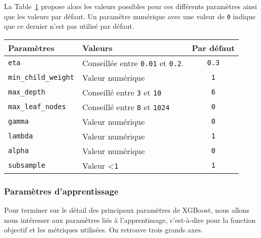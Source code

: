 La Table~\ref{tab:params-boosting} propose alors les valeurs possibles pour ces différents paramètres ainsi que les valeurs par défaut. Un paramètre numérique avec une valeur de \texttt{0} indique que ce dernier n'est pas utilisé par défaut.
\begin{table}[h]
  \begin{margincap}
    \centering
    \begin{tabular}{p{}p{}c}
	\toprule
	\textbf{Paramètres} & \textbf{Valeurs} & \textbf{Par défaut} \\
	\midrule
	\texttt{eta} & Conseillée entre \texttt{0.01} et \texttt{0.2}. & \texttt{0.3} \\
	\texttt{min\_child\_weight} & Valeur numérique & \texttt{1}\\
	\texttt{max\_depth} & Conseillé entre \texttt{3} et \texttt{10} & \texttt{6} \\
	\texttt{max\_leaf\_nodes} & Conseillé entre \texttt{8} et \texttt{1024} & \texttt{0} \\
	\texttt{gamma} & Valeur numérique & \texttt{0} \\
	\texttt{lambda} & Valeur numérique & \texttt{1} \\
	\texttt{alpha} & Valeur numérique & \texttt{0} \\
	\texttt{subsample} & Valeur <\texttt{1} & \texttt{1} \\
	\bottomrule
    \end{tabular}
	\label{tab:params-boosting}
  \end{margincap}
\end{table}

\subsubsection{Paramètres d'apprentissage}
Pour terminer sur le détail des principaux paramètres de XGBoost, nous allons nous intéresser aux paramètres liés à l'apprentissage, c'est-à-dire pour la fonction objectif et les métriques utilisées. On retrouve trois grands axes.

